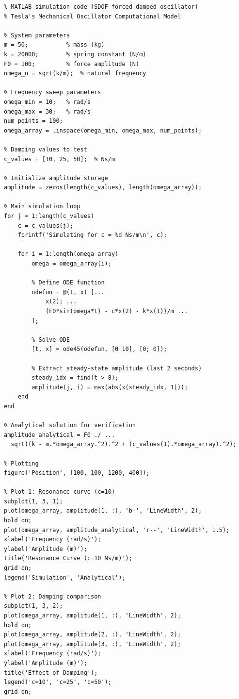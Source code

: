 \documentclass[12pt,a4paper]{article}
\begin{document}
\begin{verbatim}
% MATLAB simulation code (SDOF forced damped oscillator)
% Tesla's Mechanical Oscillator Computational Model

% System parameters
m = 50;           % mass (kg)
k = 20000;        % spring constant (N/m)
F0 = 100;         % force amplitude (N)
omega_n = sqrt(k/m);  % natural frequency

% Frequency sweep parameters
omega_min = 10;   % rad/s
omega_max = 30;   % rad/s
num_points = 100;
omega_array = linspace(omega_min, omega_max, num_points);

% Damping values to test
c_values = [10, 25, 50];  % Ns/m

% Initialize amplitude storage
amplitude = zeros(length(c_values), length(omega_array));

% Main simulation loop
for j = 1:length(c_values)
    c = c_values(j);
    fprintf('Simulating for c = %d Ns/m\n', c);
    
    for i = 1:length(omega_array)
        omega = omega_array(i);
        
        % Define ODE function
        odefun = @(t, x) [...
            x(2); ...
            (F0*sin(omega*t) - c*x(2) - k*x(1))/m ...
        ];
        
        % Solve ODE
        [t, x] = ode45(odefun, [0 10], [0; 0]);
        
        % Extract steady-state amplitude (last 2 seconds)
        steady_idx = find(t > 8);
        amplitude(j, i) = max(abs(x(steady_idx, 1)));
    end
end

% Analytical solution for verification
amplitude_analytical = F0 ./ ...
  sqrt((k - m.*omega_array.^2).^2 + (c_values(1).*omega_array).^2);

% Plotting
figure('Position', [100, 100, 1200, 400]);

% Plot 1: Resonance curve (c=10)
subplot(1, 3, 1);
plot(omega_array, amplitude(1, :), 'b-', 'LineWidth', 2);
hold on;
plot(omega_array, amplitude_analytical, 'r--', 'LineWidth', 1.5);
xlabel('Frequency (rad/s)');
ylabel('Amplitude (m)');
title('Resonance Curve (c=10 Ns/m)');
grid on;
legend('Simulation', 'Analytical');

% Plot 2: Damping comparison
subplot(1, 3, 2);
plot(omega_array, amplitude(1, :), 'LineWidth', 2);
hold on;
plot(omega_array, amplitude(2, :), 'LineWidth', 2);
plot(omega_array, amplitude(3, :), 'LineWidth', 2);
xlabel('Frequency (rad/s)');
ylabel('Amplitude (m)');
title('Effect of Damping');
legend('c=10', 'c=25', 'c=50');
grid on;


\end{verbatim}
\end{document}
